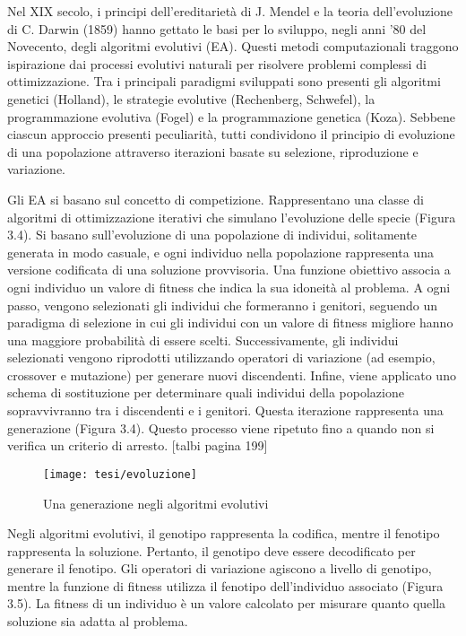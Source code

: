 Nel XIX secolo, i principi dell'ereditarietà di J. Mendel e la teoria dell'evoluzione di C. Darwin (1859) hanno gettato le basi per lo sviluppo, negli anni '80 del Novecento, degli algoritmi evolutivi (EA). Questi metodi computazionali traggono ispirazione dai processi evolutivi naturali per risolvere problemi complessi di ottimizzazione. Tra i principali paradigmi sviluppati sono presenti gli algoritmi genetici (Holland), le strategie evolutive (Rechenberg, Schwefel), la programmazione evolutiva (Fogel) e la programmazione genetica (Koza). Sebbene ciascun approccio presenti peculiarità, tutti condividono il principio di evoluzione di una popolazione attraverso iterazioni basate su selezione, riproduzione e variazione.

Gli EA si basano sul concetto di competizione. Rappresentano una classe di algoritmi di ottimizzazione iterativi che simulano l'evoluzione delle specie (Figura 3.4). Si basano sull'evoluzione di una popolazione di individui, solitamente generata in modo casuale, e ogni individuo nella popolazione rappresenta una versione codificata di una soluzione provvisoria. Una funzione obiettivo associa a ogni individuo un valore di fitness che indica la sua idoneità al problema. A ogni passo, vengono selezionati gli individui che formeranno i genitori, seguendo un paradigma di selezione in cui gli individui con un valore di fitness migliore hanno una maggiore probabilità di essere scelti. Successivamente, gli individui selezionati vengono riprodotti utilizzando operatori di variazione (ad esempio, crossover e mutazione) per generare nuovi discendenti. Infine, viene applicato uno schema di sostituzione per determinare quali individui della popolazione sopravvivranno tra i discendenti e i genitori. Questa iterazione rappresenta una generazione (Figura 3.4). Questo processo viene ripetuto fino a quando non si verifica un criterio di arresto. [talbi pagina 199]

\begin{figure}[h!] 
    \centering 
    \texttt{[image: tesi/evoluzione]} 
    \caption{Una generazione negli algoritmi evolutivi}
\end{figure}

Negli algoritmi evolutivi, il genotipo rappresenta la codifica, mentre il fenotipo rappresenta la soluzione. Pertanto, il genotipo deve essere decodificato per generare il fenotipo. Gli operatori di variazione agiscono a livello di genotipo, mentre la funzione di fitness utilizza il fenotipo dell'individuo associato (Figura 3.5). La fitness di un individuo è un valore calcolato per misurare quanto quella soluzione sia adatta al problema. 

